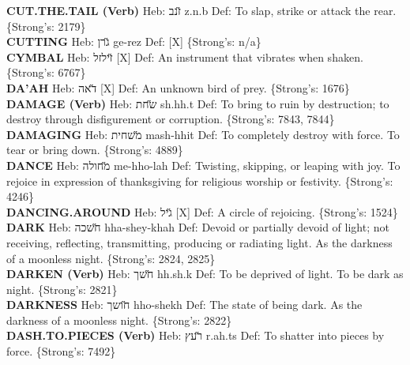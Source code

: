 {\textbf{CUT.THE.TAIL (Verb)} Heb: {\large\H זנב} z.n.b Def: To slap, strike or attack the rear. \{Strong's: 2179\}\hfill{}\\

\textbf{CUTTING} Heb: {\large\H גרן} ge-rez Def: {[}X{]} \{Strong's: n/a\}\hfill{}\\

\textbf{CYMBAL} Heb: {\large\H זילזל} {[}X{]} Def: An instrument that vibrates when shaken. \{Strong's: 6767\}\hfill{}\\

\textbf{DA'AH} Heb: {\large\H דאה} {[}X{]} Def: An unknown bird of prey. \{Strong's: 1676\}\hfill{}\\

\textbf{DAMAGE (Verb)} Heb: {\large\H שחת} sh.hh.t Def: To bring to ruin by destruction; to destroy through disfigurement or corruption. \{Strong's: 7843, 7844\}\hfill{}\\

\textbf{DAMAGING} Heb: {\large\H משחית} mash-hhit Def: To completely destroy with force. To tear or bring down. \{Strong's: 4889\}\hfill{}\\

\textbf{DANCE} Heb: {\large\H מחולה} me-hho-lah Def: Twisting, skipping, or leaping with joy. To rejoice in expression of thanksgiving for religious worship or festivity. \{Strong's: 4246\}\hfill{}\\

\textbf{DANCING.AROUND} Heb: {\large\H גיל} {[}X{]} Def: A circle of rejoicing. \{Strong's: 1524\}\hfill{}\\

\textbf{DARK} Heb: {\large\H חשכה} hha-shey-khah Def: Devoid or partially devoid of light; not receiving, reflecting, transmitting, producing or radiating light. As the darkness of a moonless night. \{Strong's: 2824, 2825\}\hfill{}\\

\textbf{DARKEN (Verb)} Heb: {\large\H חשך} hh.sh.k Def: To be deprived of light. To be dark as night. \{Strong's: 2821\}\hfill{}\\

\textbf{DARKNESS} Heb: {\large\H חושך} hho-shekh Def: The state of being dark. As the darkness of a moonless night. \{Strong's: 2822\}\hfill{}\\

\textbf{DASH.TO.PIECES (Verb)} Heb: {\large\H רעץ} r.ah.ts Def: To shatter into pieces by force. \{Strong's: 7492\}\hfill{}\\

}
